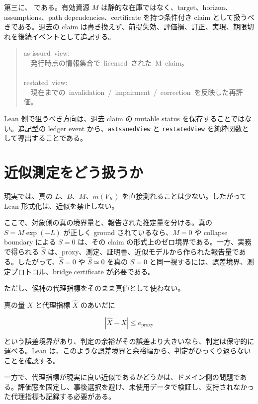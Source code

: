 \documentclass[12pt,a4paper]{article}
\begin{document}
第三に、{\scriptsize{}} である。有効資源 \(M\) は静的な在庫ではなく、target、horizon、assumptions、path dependencies、certificate を持つ条件付き claim として扱うべきである。過去の claim は書き換えず、前提失効、評価損、訂正、実現、期限切れを後続イベントとして追記する。

\begin{quote}
{\small\ttfamily\noindent
as-issued~view: \\~~発行時点の情報集合で~licensed~された~M~claim。 \\~ \\restated~view: \\~~現在までの~invalidation~/~impairment~/~correction~を反映した再評価。
}
\end{quote}

Lean 側で狙うべき方向は、過去 claim の mutable status を保存することではない。追記型の ledger event から、\texttt{asIssuedView} と \texttt{restatedView} を純粋関数として導出することである。

\section{近似測定をどう扱うか}\label{ux8fd1ux4f3cux6e2cux5b9aux3092ux3069ux3046ux6271ux3046ux304b}

現実では、真の \(L\)、\(B\)、\(M\)、\(m(V_K)\) を直接測れることは少ない。したがって Lean 形式化は、近似を禁止しない。

ここで、対象側の真の境界量と、報告された推定量を分ける。真の \(S=M\exp(-L)\) が正しく ground されているなら、\(M=0\) や collapse boundary による \(S=0\) は、その claim の形式上のゼロ境界である。一方、実務で得られる \(\hat S\) は、proxy、測定、証明書、近似モデルから作られた報告量である。したがって、\(\hat S=0\) や \(\hat S\simeq 0\) を真の \(S=0\) と同一視するには、誤差境界、測定プロトコル、bridge certificate が必要である。

ただし、候補の代理指標をそのまま真値として使わない。

真の量 \(X\) と代理指標 \(\hat X\) のあいだに

\[
|\hat X-X|\le e_{\mathrm{proxy}}
\]

という誤差境界があり、判定の余裕がその誤差より大きいなら、判定は保守的に運べる。Lean は、このような誤差境界と余裕幅から、判定がひっくり返らないことを確認する。

一方で、代理指標が現実に良い近似であるかどうかは、ドメイン側の問題である。評価窓を固定し、事後選択を避け、未使用データで検証し、支持されなかった代理指標も記録する必要がある。
\end{document}
